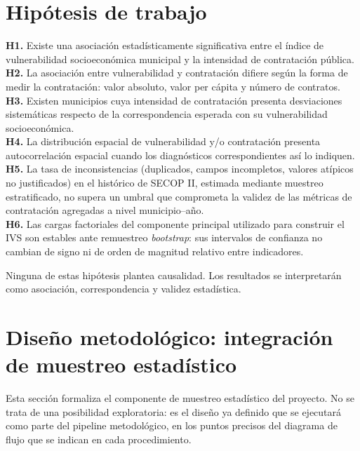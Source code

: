 \documentclass[11pt,letterpaper]{article}
\newenvironment{recuadro}[1]{%
  \begin{tcolorbox}[breakable,colback=boxbg,colframe=ustablue,boxrule=0.6pt,arc=1.5pt,
  title={\small\bfseries #1},fonttitle=\small,coltitle=white,colbacktitle=ustablue,
  left=6pt,right=6pt,top=4pt,bottom=4pt]
}{\end{tcolorbox}}
\begin{document}
\section{Hipótesis de trabajo}

\begin{recuadro}{Hipótesis H1 -- H6}
\textbf{H1.} Existe una asociación estadísticamente significativa entre el
índice de vulnerabilidad socioeconómica municipal y la intensidad de
contratación pública.\\[4pt]
\textbf{H2.} La asociación entre vulnerabilidad y contratación difiere según la
forma de medir la contratación: valor absoluto, valor per cápita y número de
contratos.\\[4pt]
\textbf{H3.} Existen municipios cuya intensidad de contratación presenta
desviaciones sistemáticas respecto de la correspondencia esperada con su
vulnerabilidad socioeconómica.\\[4pt]
\textbf{H4.} La distribución espacial de vulnerabilidad y/o contratación
presenta autocorrelación espacial cuando los diagnósticos correspondientes así
lo indiquen.\\[4pt]
\textbf{H5.} La tasa de inconsistencias (duplicados, campos incompletos,
valores atípicos no justificados) en el histórico de SECOP II, estimada
mediante muestreo estratificado, no supera un umbral que comprometa la validez
de las métricas de contratación agregadas a nivel municipio--año.\\[4pt]
\textbf{H6.} Las cargas factoriales del componente principal utilizado para
construir el IVS son estables ante remuestreo \textit{bootstrap}: sus
intervalos de confianza no cambian de signo ni de orden de magnitud relativo
entre indicadores.
\end{recuadro}

Ninguna de estas hipótesis plantea causalidad. Los resultados se interpretarán
como asociación, correspondencia y validez estadística.

\section{Diseño metodológico: integración de muestreo estadístico}

Esta sección formaliza el componente de muestreo estadístico del proyecto. No
se trata de una posibilidad exploratoria: es el diseño ya definido que se
ejecutará como parte del pipeline metodológico, en los puntos precisos del
diagrama de flujo que se indican en cada procedimiento.
\end{document}
